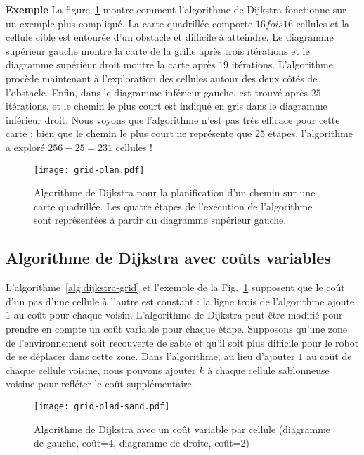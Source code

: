 \noindent\textbf{Exemple} La figure~\ref{fig.dijkstra} montre comment l'algorithme de Dijkstra fonctionne sur un exemple plus compliqué. La carte quadrillée comporte $16 fois 16$ cellules et la cellule cible  est entourée d'un obstacle et difficile à atteindre. Le diagramme supérieur gauche montre la carte de la grille après trois itérations et le diagramme supérieur droit montre la carte après $19$ itérations. L'algorithme procède maintenant à l'exploration des cellules autour des deux côtés de l'obstacle. Enfin, dans le diagramme inférieur gauche,  est trouvé après $25$ itérations, et le chemin le plus court est indiqué en gris dans le diagramme inférieur droit. Nous voyons que l'algorithme n'est pas très efficace pour cette carte : bien que le chemin le plus court ne représente que $25$ étapes, l'algorithme a exploré $256-25=231$ cellules !

\begin{figure}
\begin{center}
\texttt{[image: grid-plan.pdf]}
\end{center}
\caption{Algorithme de Dijkstra pour la planification d'un chemin sur une carte quadrillée. Les quatre étapes de l'exécution de l'algorithme sont représentées à partir du diagramme supérieur gauche.}\label{fig.dijkstra}
\end{figure}

\subsection{Algorithme de Dijkstra avec coûts variables}

L'algorithme~\ref{alg.dijkstra-grid} et l'exemple de la Fig.~\ref{fig.dijkstra} supposent que le coût d'un pas d'une cellule à l'autre est constant : la ligne trois de l'algorithme ajoute $1$ au coût pour chaque voisin. L'algorithme de Dijkstra peut être modifié pour prendre en compte un coût variable pour chaque étape. Supposons qu'une zone de l'environnement soit recouverte de sable et qu'il soit plus difficile pour le robot de se déplacer dans cette zone. Dans l'algorithme, au lieu d'ajouter $1$ au coût de chaque cellule voisine, nous pouvons ajouter $k$ à chaque cellule sablonneuse voisine pour refléter le coût supplémentaire.

\begin{figure}
\begin{center}
\texttt{[image: grid-plad-sand.pdf]}
\end{center}
\caption{Algorithme de Dijkstra avec un coût variable par cellule (diagramme de gauche, coût=$4$, diagramme de droite, coût=$2$)}\label{fig.path-sand}
\end{figure}

